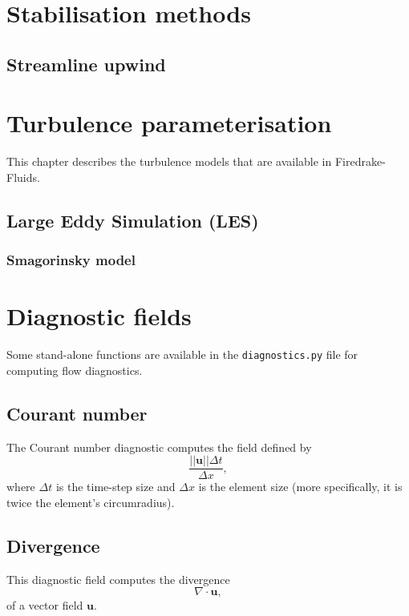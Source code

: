 \documentclass[a4paper,11pt]{report}
\begin{document}
\chapter{Stabilisation methods}\label{chap:stabilisation}

\section{Streamline upwind}


\chapter{Turbulence parameterisation}
This chapter describes the turbulence models that are available in Firedrake-Fluids.

\section{Large Eddy Simulation (LES)}

\subsection{Smagorinsky model}



\chapter{Diagnostic fields}
Some stand-alone functions are available in the \texttt{diagnostics.py} file for computing flow diagnostics.

\section{Courant number}
The Courant number diagnostic computes the field defined by
\begin{equation}
   \frac{||\mathbf{u}||\Delta t}{\Delta x},
\end{equation}
where $\Delta t$ is the time-step size and $\Delta x$ is the element size (more specifically, it is twice the element's circumradius).

\section{Divergence}
This diagnostic field computes the divergence
\begin{equation}
   \nabla\cdot\mathbf{u},
\end{equation}
of a vector field $\mathbf{u}$.



\end{document}
